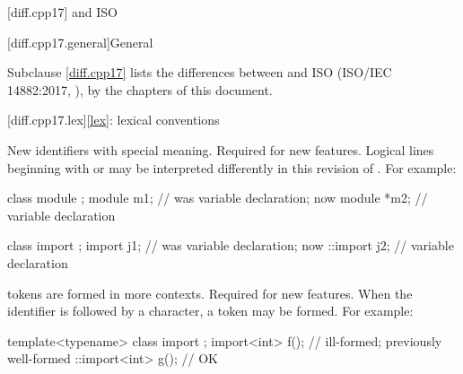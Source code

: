 [diff.cpp17]{\Cpp{} and ISO \CppXVII{}}

[diff.cpp17.general]{General}

\pnum
{}%
Subclause \ref{diff.cpp17} lists the differences between \Cpp{} and
ISO \CppXVII{} (ISO/IEC 14882:2017, ),
by the chapters of this document.

[diff.cpp17.lex]{\ref{lex}: lexical conventions}

\change
New identifiers with special meaning.
\rationale
Required for new features.
\effect
Logical lines beginning with
 or  may
be interpreted differently
in this revision of \Cpp{}.
For example:
\begin{codeblock}
class module {};
module m1;          // was variable declaration; now 
module *m2;         // variable declaration

class import {};
import j1;          // was variable declaration; now 
::import j2;        // variable declaration
\end{codeblock}

\change
{} tokens are formed in more contexts.
\rationale
Required for new features.
\effect
When the identifier 
is followed by a \tcode{<} character,
a  token may be formed.
For example:
\begin{codeblock}
template<typename> class import {};
import<int> f();                // ill-formed; previously well-formed
::import<int> g();              // OK
\end{codeblock}

